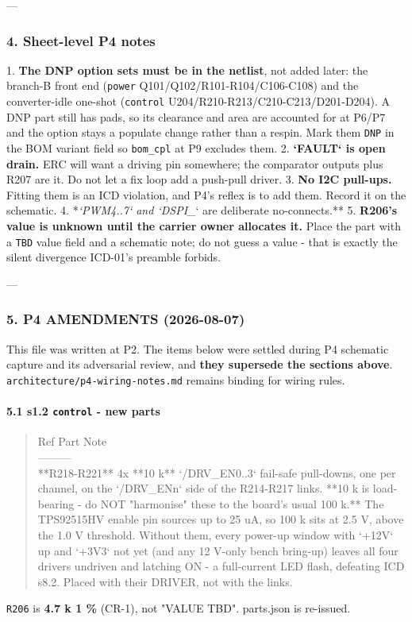 \documentclass[11pt,a4paper]{article}
\begin{document}
---

\subsubsection*{4. Sheet-level P4 notes}
1. \textbf{The DNP option sets must be in the netlist}, not added later: the branch-B front end (\texttt{power} Q101/Q102/R101-R104/C106-C108) and the converter-idle one-shot (\texttt{control} U204/R210-R213/C210-C213/D201-D204). A DNP part still has pads, so its clearance and area are accounted for at P6/P7 and the option stays a populate change rather than a respin. Mark them \texttt{DNP} in the BOM variant field so \texttt{bom\_cpl} at P9 excludes them. 2. \textbf{`FAULT` is open drain.} ERC will want a driving pin somewhere; the comparator outputs plus R207 are it. Do not let a fix loop add a push-pull driver. 3. \textbf{No I2C pull-ups.} Fitting them is an ICD violation, and P4's reflex is to add them. Record it on the schematic. 4. {*}\emph{`PWM4..7` and `DSPI\_}` are deliberate no-connects.{*}{*} 5. \textbf{R206's value is unknown until the carrier owner allocates it.} Place the part with a \texttt{TBD} value field and a schematic note; do not guess a value - that is exactly the silent divergence ICD-01's preamble forbids.

---

\subsubsection*{5. P4 AMENDMENTS (2026-08-07)}
This file was written at P2. The items below were settled during P4 schematic capture and its adversarial review, and \textbf{they supersede the sections above}. \texttt{architecture/p4-wiring-notes.md} remains binding for wiring rules.

\paragraph*{5.1 s1.2 \texttt{control} - new parts}
\begin{quote}\small\ttfamily\raggedright
\textbar{} Ref \textbar{} Part \textbar{} Note \textbar{}\\
\textbar{}---\textbar{}---\textbar{}---\textbar{}\\
\textbar{} {*}{*}R218-R221{*}{*} \textbar{} 4x {*}{*}10 k{*}{*} \textbar{} `/DRV\_EN0..3` fail-safe pull-downs, one per channel, on the `/DRV\_ENn` side of the R214-R217 links. {*}{*}10 k is load-bearing - do NOT "harmonise" these to the board's usual 100 k.{*}{*} The TPS92515HV enable pin sources up to 25 uA, so 100 k sits at 2.5 V, above the 1.0 V threshold. Without them, every power-up window with `+12V` up and `+3V3` not yet (and any 12 V-only bench bring-up) leaves all four drivers undriven and latching ON - a full-current LED flash, defeating ICD s8.2. Placed with their DRIVER, not with the links. \textbar{}
\end{quote}
\texttt{R206} is \textbf{4.7 k 1 \%} (CR-1), not "VALUE TBD". parts.json is re-issued.
\end{document}
